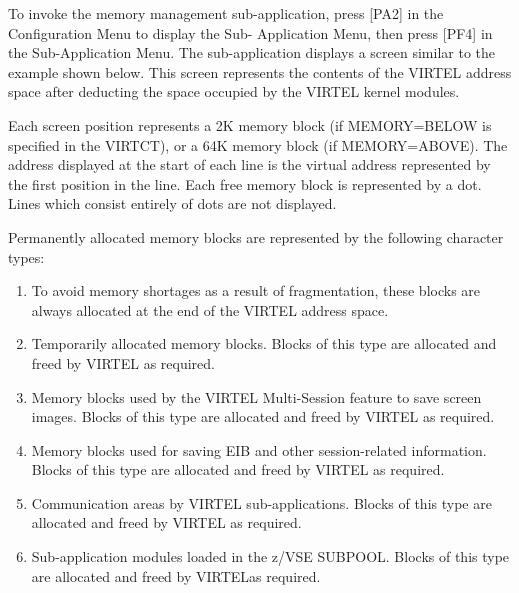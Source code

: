 \documentclass[letterpaper,10pt,english]{sphinxmanual}
\begin{document}
To invoke the memory management sub-application, press {[}PA2{]} in the Configuration Menu to display the Sub- Application Menu, then press {[}PF4{]} in the Sub-Application Menu. The sub-application displays a screen similar to the example shown below. This screen represents the contents of the VIRTEL address space after deducting the space  occupied by the VIRTEL kernel modules.



Each screen position represents a 2K memory block (if MEMORY=BELOW is specified in the VIRTCT), or a 64K memory block (if MEMORY=ABOVE). The address displayed at the start of each line is the virtual address represented by the first position in the line. Each free memory block is represented by a dot. Lines which consist entirely of dots are not displayed.

Permanently allocated memory blocks are represented by the following character types:
\begin{enumerate}
\item {} 
To avoid memory shortages as a result of fragmentation, these blocks are always allocated at the end of the VIRTEL address space.

\item {} 
Temporarily allocated memory blocks. Blocks of this type are allocated and freed by VIRTEL as required.

\item {} 
Memory blocks used by the VIRTEL Multi-Session feature to save screen images. Blocks of this type are allocated and freed by VIRTEL as required.

\item {} 
Memory blocks used for saving EIB and other session-related information. Blocks of this type are allocated and freed by VIRTEL as required.

\item {} 
Communication areas by VIRTEL sub-applications. Blocks of this type are allocated and freed by VIRTEL as required.

\item {} 
Sub-application modules loaded in the z/VSE SUBPOOL. Blocks of this type are allocated and freed by VIRTELas required.

\end{enumerate}

\end{document}

